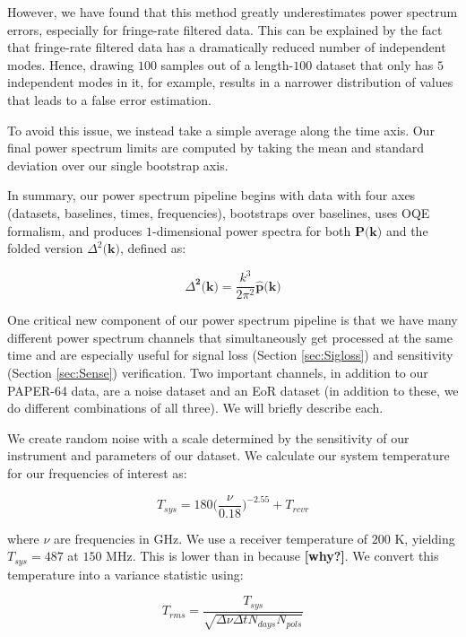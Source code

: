 \documentclass[preprint2,numberedappendix,tighten,twocolappendix]{aastex6}  %
\newcommand{\cc}[1]{{\color{purple} \textbf{[#1]}}}
\begin{document}
However, we have found that this method greatly underestimates power spectrum errors, especially for fringe-rate filtered data. This can be explained by the fact that fringe-rate filtered data has a dramatically reduced number of independent modes. Hence, drawing $100$ samples out of a length-$100$ dataset that only has $5$ independent modes in it, for example, results in a narrower distribution of values that leads to a false error estimation.

To avoid this issue, we instead take a simple average along the time axis. Our final power spectrum limits are computed by taking the mean and standard deviation over our single bootstrap axis. 

In summary, our power spectrum pipeline begins with data with four axes (datasets, baselines, times, frequencies), bootstraps over baselines, uses OQE formalism, and produces $1$-dimensional power spectra for both $\textbf{P(k)}$ and the folded version $\Delta^{2}\textbf{(k)}$, defined as:

\begin{equation}
\Delta^{\textbf{2}}\textbf{(k)} = \frac{k^{3}}{2\pi^{2}}\hat{\textbf{p}}\textbf{(k)}
\end{equation}

One critical new component of our power spectrum pipeline is that we have many different power spectrum channels that simultaneously get processed at the same time and are especially useful for signal loss (Section \ref{sec:Sigloss}) and sensitivity (Section \ref{sec:Sense}) verification. Two important channels, in addition to our PAPER-64 data, are a noise dataset and an EoR dataset (in addition to these, we do different combinations of all three). We will briefly describe each.

We create random noise with a scale determined by the sensitivity of our instrument and parameters of our dataset. We calculate our system temperature for our frequencies of interest as:

\begin{equation}
T_{sys} = 180\Big(\frac{\nu}{0.18}\Big)^{-2.55} + T_{rcvr}
\end{equation}

where $\nu$ are frequencies in GHz. We use a receiver temperature of $200$ K, yielding $T_{sys} = 487$ at $150$ MHz. This is lower than in \citet{ali_et_al2015} because \cc{why?}. We convert this temperature into a variance statistic using:

\begin{equation}
T_{rms} = \frac{T_{sys}}{\sqrt{\Delta\nu \Delta t N_{days} N_{pols}}}
\end{equation}
\end{document}
